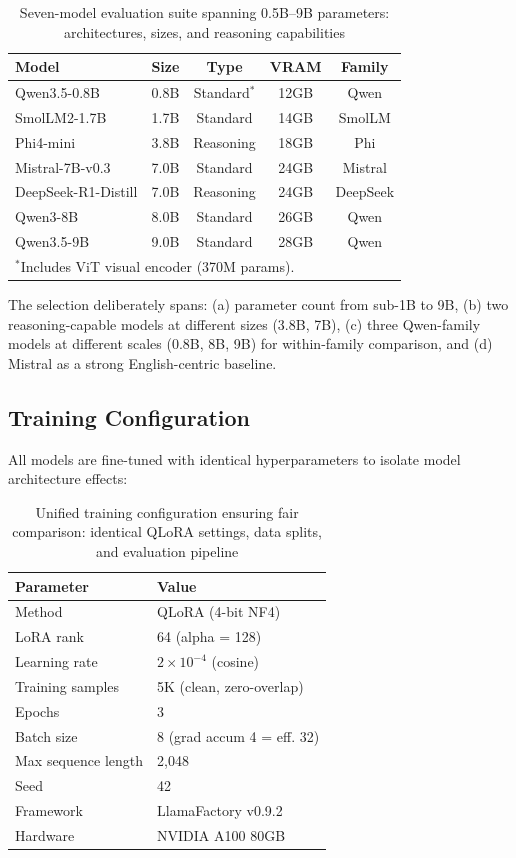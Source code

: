 \documentclass[review,3p]{elsarticle}
\begin{document}
\begin{table}[!ht]
\centering
\caption{Seven-model evaluation suite spanning 0.5B--9B parameters: architectures, sizes, and reasoning capabilities}
\label{tab:models}
\begin{tabular}{lrccc}
\toprule
\textbf{Model} & \textbf{Size} & \textbf{Type} & \textbf{VRAM} & \textbf{Family} \\
\midrule
Qwen3.5-0.8B & 0.8B & Standard$^*$ & 12GB & Qwen \\
SmolLM2-1.7B & 1.7B & Standard & 14GB & SmolLM \\
Phi4-mini & 3.8B & Reasoning & 18GB & Phi \\
Mistral-7B-v0.3 & 7.0B & Standard & 24GB & Mistral \\
DeepSeek-R1-Distill & 7.0B & Reasoning & 24GB & DeepSeek \\
Qwen3-8B & 8.0B & Standard & 26GB & Qwen \\
Qwen3.5-9B & 9.0B & Standard & 28GB & Qwen \\
\bottomrule
\multicolumn{5}{l}{\scriptsize $^*$Includes ViT visual encoder (370M params).}
\end{tabular}
\end{table}

The selection deliberately spans: (a) parameter count from sub-1B to 9B, (b) two reasoning-capable models at different sizes (3.8B, 7B), (c) three Qwen-family models at different scales (0.8B, 8B, 9B) for within-family comparison, and (d) Mistral as a strong English-centric baseline.

\subsection{Training Configuration}
All models are fine-tuned with identical hyperparameters to isolate model architecture effects:

\begin{table}[!ht]
\centering
\caption{Unified training configuration ensuring fair comparison: identical QLoRA settings, data splits, and evaluation pipeline}
\label{tab:config}
\begin{tabular}{ll}
\toprule
\textbf{Parameter} & \textbf{Value} \\
\midrule
Method & QLoRA (4-bit NF4) \\
LoRA rank & 64 (alpha = 128) \\
Learning rate & $2 \times 10^{-4}$ (cosine) \\
Training samples & 5K (clean, zero-overlap) \\
Epochs & 3 \\
Batch size & 8 (grad accum 4 = eff. 32) \\
Max sequence length & 2,048 \\
Seed & 42 \\
Framework & LlamaFactory v0.9.2 \\
Hardware & NVIDIA A100 80GB \\
\bottomrule
\end{tabular}
\end{table}
\end{document}
